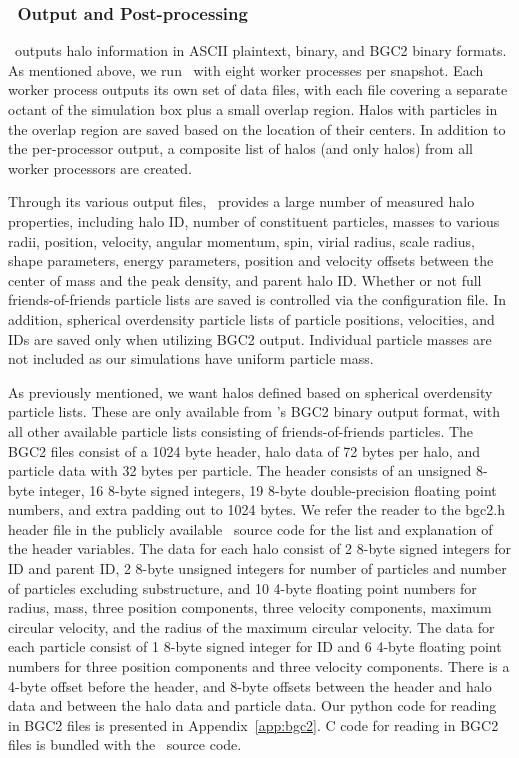 \subsubsection{\rockstar\ Output and Post-processing}
\label{subsubsec:analysis--halo_properties--output}


\rockstar\ outputs halo information in ASCII plaintext, binary, and BGC2 binary formats.  As mentioned above, we run \rockstar\ with eight worker processes per snapshot.  Each worker process outputs its own set of data files, with each file covering a separate octant of the simulation box plus a small overlap region.  Halos with particles in the overlap region are saved based on the location of their centers.  In addition to the per-processor output, a composite list of halos (and only halos) from all worker processors are created.

Through its various output files, \rockstar\ provides a large number of measured halo properties, including halo ID, number of constituent particles, masses to various radii, position, velocity, angular momentum, spin, virial radius, scale radius, shape parameters, energy parameters, position and velocity offsets between the center of mass and the peak density, and parent halo ID.  Whether or not full friends-of-friends particle lists are saved is controlled via the configuration file.  In addition, spherical overdensity particle lists of particle positions, velocities, and IDs are saved only when utilizing BGC2 output.  Individual particle masses are not included as our simulations have uniform particle mass.

As previously mentioned, we want halos defined based on spherical overdensity particle lists.  These are only available from \rockstar's BGC2 binary output format, with all other available particle lists consisting of friends-of-friends particles.  The BGC2 files consist of a 1024 byte header, halo data of 72 bytes per halo, and particle data with 32 bytes per particle.  The header consists of an unsigned 8-byte integer, 16 8-byte signed integers, 19 8-byte double-precision floating point numbers, and extra padding out to 1024 bytes.  We refer the reader to the bgc2.h header file in the publicly available \rockstar\ source code for the list and explanation of the header variables.  The data for each halo consist of 2 8-byte signed integers for ID and parent ID, 2 8-byte unsigned integers for number of particles and number of particles excluding substructure, and 10 4-byte floating point numbers for radius, mass, three position components, three velocity components, maximum circular velocity, and the radius of the maximum circular velocity.  The data for each particle consist of 1 8-byte signed integer for ID and 6 4-byte floating point numbers for three position components and three velocity components.  There is a 4-byte offset before the header, and 8-byte offsets between the header and halo data and between the halo data and particle data.  Our python code for reading in BGC2 files is presented in Appendix~\ref{app:bgc2}.  C code for reading in BGC2 files is bundled with the \rockstar\ source code.


